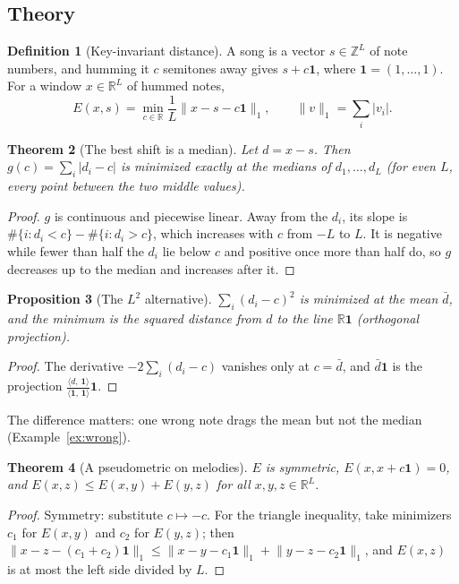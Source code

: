 \documentclass[11pt]{article}
\newtheorem{theorem}{Theorem}[section]
\newtheorem{proposition}[theorem]{Proposition}
\theoremstyle{definition}
\newtheorem{definition}[theorem]{Definition}
\newcommand{\R}{\mathbb{R}}
\newcommand{\Z}{\mathbb{Z}}
\newcommand{\ip}[2]{\langle #1,\, #2\rangle}
\newcommand{\norm}[1]{\lVert #1\rVert}
\newcommand{\abs}[1]{\lvert #1\rvert}
\newcommand{\one}{\mathbf{1}}
\begin{document}
\subsection{Theory}

\begin{definition}[Key-invariant distance]
A song is a vector $s\in\Z^L$ of note numbers, and humming it $c$ semitones away gives
$s+c\one$, where $\one=(1,\dots,1)$. For a window $x\in\R^L$ of hummed notes,
\[
E(x,s)=\min_{c\in\R}\frac1L\norm{x-s-c\one}_1,
\qquad\norm v_1=\sum_i\abs{v_i}.
\]
\end{definition}

\begin{theorem}[The best shift is a median]\label{thm:median}
Let $d=x-s$. Then $g(c)=\sum_i\abs{d_i-c}$ is minimized exactly at the medians of
$d_1,\dots,d_L$ (for even $L$, every point between the two middle values).
\end{theorem}
\begin{proof}
$g$ is continuous and piecewise linear. Away from the $d_i$, its slope is
$\#\{i:d_i<c\}-\#\{i:d_i>c\}$, which increases with $c$ from $-L$ to $L$. It is
negative while fewer than half the $d_i$ lie below $c$ and positive once more than half
do, so $g$ decreases up to the median and increases after it.
\end{proof}

\begin{proposition}[The $L^2$ alternative]
$\sum_i(d_i-c)^2$ is minimized at the mean $\bar d$, and the minimum is the squared
distance from $d$ to the line $\R\one$ (orthogonal projection).
\end{proposition}
\begin{proof}
The derivative $-2\sum_i(d_i-c)$ vanishes only at $c=\bar d$, and $\bar d\one$ is the
projection $\frac{\ip d\one}{\ip\one\one}\one$.
\end{proof}

The difference matters: one wrong note drags the mean but not the median
(Example~\ref{ex:wrong}).

\begin{theorem}[A pseudometric on melodies]\label{thm:pseudo}
$E$ is symmetric, $E(x,x+c\one)=0$, and $E(x,z)\le E(x,y)+E(y,z)$ for all
$x,y,z\in\R^L$.
\end{theorem}
\begin{proof}
Symmetry: substitute $c\mapsto-c$. For the triangle inequality, take minimizers $c_1$
for $E(x,y)$ and $c_2$ for $E(y,z)$; then
$\norm{x-z-(c_1+c_2)\one}_1\le\norm{x-y-c_1\one}_1+\norm{y-z-c_2\one}_1$, and
$E(x,z)$ is at most the left side divided by $L$.
\end{proof}
\end{document}
